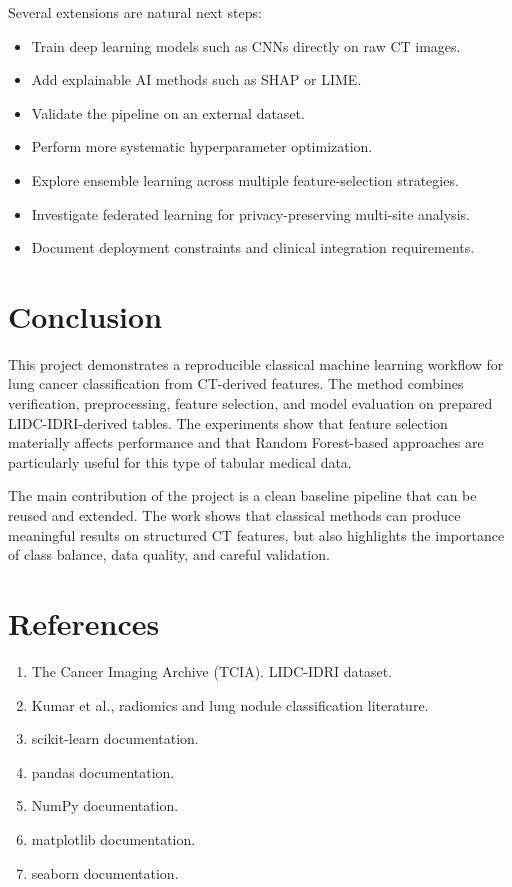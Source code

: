 \documentclass[11pt,a4paper]{article}
\begin{document}
Several extensions are natural next steps:
\begin{itemize}[leftmargin=*]
    \item Train deep learning models such as CNNs directly on raw CT images.
    \item Add explainable AI methods such as SHAP or LIME.
    \item Validate the pipeline on an external dataset.
    \item Perform more systematic hyperparameter optimization.
    \item Explore ensemble learning across multiple feature-selection strategies.
    \item Investigate federated learning for privacy-preserving multi-site analysis.
    \item Document deployment constraints and clinical integration requirements.
\end{itemize}


\section{Conclusion}


This project demonstrates a reproducible classical machine learning workflow for lung cancer classification from CT-derived features. The method combines verification, preprocessing, feature selection, and model evaluation on prepared LIDC-IDRI-derived tables. The experiments show that feature selection materially affects performance and that Random Forest-based approaches are particularly useful for this type of tabular medical data.

The main contribution of the project is a clean baseline pipeline that can be reused and extended. The work shows that classical methods can produce meaningful results on structured CT features, but also highlights the importance of class balance, data quality, and careful validation.


\section{References}


\begin{enumerate}[leftmargin=*]
    \item The Cancer Imaging Archive (TCIA). LIDC-IDRI dataset.
    \item Kumar et al., radiomics and lung nodule classification literature.
    \item scikit-learn documentation.
    \item pandas documentation.
    \item NumPy documentation.
    \item matplotlib documentation.
    \item seaborn documentation.
\end{enumerate}
\end{document}
